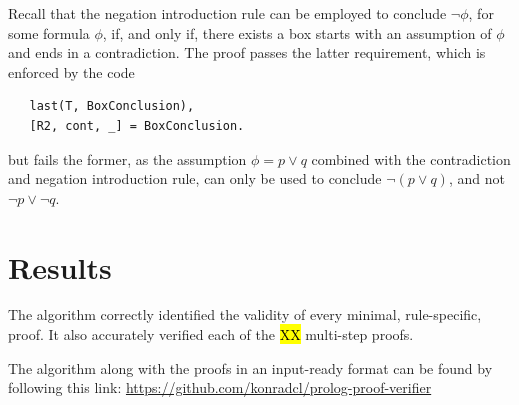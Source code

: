 \documentclass[a4paper, 11pt]{article}
\begin{document}
   Recall that the negation introduction rule can be employed
   to conclude $\neg \phi$, for some formula $\phi$, if, and 
   only if, there exists a box starts with an assumption of
   $\phi$ and ends in a contradiction. The proof passes the
   latter requirement, which is enforced by the code

\begin{verbatim}
   last(T, BoxConclusion),
   [R2, cont, _] = BoxConclusion.
\end{verbatim}

   but fails the former, as the assumption $\phi = p \vee q$
   combined with the contradiction and negation introduction 
   rule, can only be used to conclude $\neg (p \vee q)$, and
   not $\neg p \vee \neg q$.

   \section{Results}
   The algorithm correctly identified the validity of every
   minimal, rule-specific, proof. It also accurately verified
   each of the \hl{XX} multi-step proofs.
   \bigbreak

   The algorithm along with the proofs in an input-ready
   format can be found by following this link: 
   \url{https://github.com/konradcl/prolog-proof-verifier}
\end{document}
